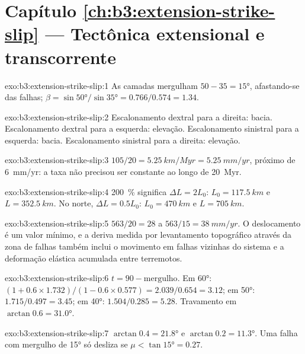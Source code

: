 \section*{Capítulo \ref{ch:b3:extension-strike-slip} --- Tectônica extensional e transcorrente}

\begin{solution}{exo:b3:extension-strike-slip:1}
As camadas mergulham $50 - 35 = \ang{15}$, afastando-se das falhas; $\beta =
\sin\ang{50}/\sin\ang{35} = 0.766/0.574 = 1.34$.
\end{solution}

\begin{solution}{exo:b3:extension-strike-slip:2}
Escalonamento dextral para a direita: bacia. Escalonamento dextral para a esquerda: elevação. Escalonamento
sinistral para a esquerda: bacia. Escalonamento sinistral para a direita: elevação.
\end{solution}

\begin{solution}{exo:b3:extension-strike-slip:3}
$105/20 = \qty{5.25}{km/Myr} = \qty{5.25}{mm/yr}$, próximo de
\qty{6}{mm/yr}: a taxa não precisou ser constante ao longo de \qty{20}{Myr}.
\end{solution}

\begin{solution}{exo:b3:extension-strike-slip:4}
\qty{200}{\percent} significa $\Delta L = 2L_0$: $L_0 = \qty{117.5}{km}$ e $L
= \qty{352.5}{km}$. No norte, $\Delta L = 0.5L_0$: $L_0 = \qty{470}{km}$
e $L = \qty{705}{km}$.
\end{solution}

\begin{solution}{exo:b3:extension-strike-slip:5}
$563/20 = 28$ a $563/15 = \qty{38}{mm/yr}$. O deslocamento é um valor mínimo, e
a deriva medida por levantamento topográfico através da zona de falhas também inclui o movimento em
falhas vizinhas do sistema e a deformação elástica acumulada entre
terremotos.
\end{solution}

\begin{solution}{exo:b3:extension-strike-slip:6}
$t = 90 - \text{mergulho}$. Em \ang{60}: $(1 + 0.6\times1.732)/(1 - 0.6\times
0.577) = 2.039/0.654 = 3.12$; em \ang{50}: $1.715/0.497 = 3.45$; em
\ang{40}: $1.504/0.285 = 5.28$. Travamento em $\arctan0.6 = \ang{31.0}$.
\end{solution}

\begin{solution}{exo:b3:extension-strike-slip:7}
$\arctan0.4 = \ang{21.8}$ e $\arctan0.2 = \ang{11.3}$. Uma falha com mergulho de
\ang{15} só desliza se $\mu < \tan\ang{15} = 0.27$.
\end{solution}

